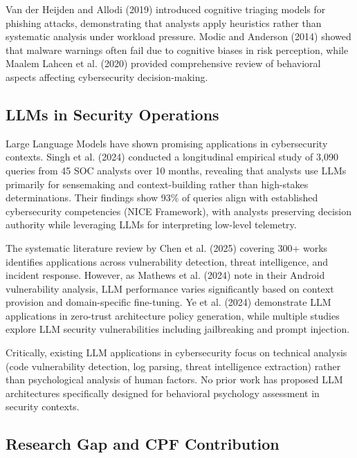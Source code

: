 \documentclass[11pt, a4paper]{article}
\begin{document}
Van der Heijden and Allodi (2019)\cite{vanderheijden2019cognitive} introduced cognitive triaging models for phishing attacks, demonstrating that analysts apply heuristics rather than systematic analysis under workload pressure. Modic and Anderson (2014)\cite{modic2014reading} showed that malware warnings often fail due to cognitive biases in risk perception, while Maalem Lahcen et al. (2020)\cite{maalem2020review} provided comprehensive review of behavioral aspects affecting cybersecurity decision-making.

\subsection{LLMs in Security Operations}

Large Language Models have shown promising applications in cybersecurity contexts. Singh et al. (2024)\cite{singh2024llms} conducted a longitudinal empirical study of 3,090 queries from 45 SOC analysts over 10 months, revealing that analysts use LLMs primarily for sensemaking and context-building rather than high-stakes determinations. Their findings show 93\% of queries align with established cybersecurity competencies (NICE Framework), with analysts preserving decision authority while leveraging LLMs for interpreting low-level telemetry.

The systematic literature review by Chen et al. (2025)\cite{chen2025llms} covering 300+ works identifies applications across vulnerability detection, threat intelligence, and incident response. However, as Mathews et al. (2024)\cite{mathews2024llm} note in their Android vulnerability analysis, LLM performance varies significantly based on context provision and domain-specific fine-tuning. Ye et al. (2024)\cite{ye2024zerotrust} demonstrate LLM applications in zero-trust architecture policy generation, while multiple studies\cite{ouyang2022training,liu2023secrets} explore LLM security vulnerabilities including jailbreaking and prompt injection.

Critically, existing LLM applications in cybersecurity focus on technical analysis (code vulnerability detection, log parsing, threat intelligence extraction) rather than psychological analysis of human factors. No prior work has proposed LLM architectures specifically designed for behavioral psychology assessment in security contexts.

\subsection{Research Gap and CPF Contribution}
\end{document}
